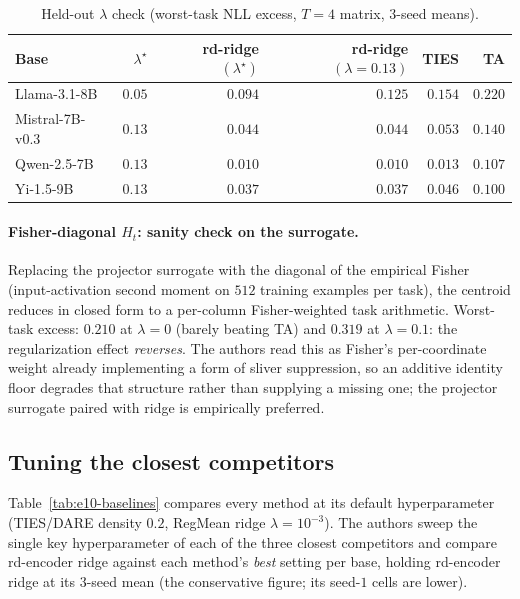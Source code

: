 \begin{table}[h]
\centering
\caption{Held-out $\lambda$ check (worst-task NLL excess, $T = 4$
matrix, $3$-seed means).}
\label{tab:rd-ridge-heldout}
\begin{tabular}{lrrrrr}
\hline
Base & $\lambda^\star$ & rd-ridge $(\lambda^\star)$ & rd-ridge $(\lambda{=}0.13)$ & TIES & TA \\
\hline
Llama-3.1-8B    & $0.05$ & $\mathbf{0.094}$ & $0.125$ & $0.154$ & $0.220$ \\
Mistral-7B-v0.3 & $0.13$ & $\mathbf{0.044}$ & $0.044$ & $0.053$ & $0.140$ \\
Qwen-2.5-7B     & $0.13$ & $\mathbf{0.010}$ & $0.010$ & $0.013$ & $0.107$ \\
Yi-1.5-9B       & $0.13$ & $\mathbf{0.037}$ & $0.037$ & $0.046$ & $0.100$ \\
\hline
\end{tabular}
\end{table}

\paragraph{Fisher-diagonal $H_t$: sanity check on the surrogate.}
Replacing the projector surrogate with the diagonal of the empirical
Fisher (input-activation second moment on $512$ training examples per
task), the centroid reduces in closed form to a per-column
Fisher-weighted task arithmetic. Worst-task excess: $0.210$ at
$\lambda = 0$ (barely beating TA) and $0.319$ at $\lambda = 0.1$:
the regularization effect \emph{reverses}. The authors read this as Fisher's
per-coordinate weight already implementing a form of sliver
suppression, so an additive identity floor degrades that structure
rather than supplying a missing one; the projector surrogate paired
with ridge is empirically preferred.

\subsection{Tuning the closest competitors}
\label{subsec:exp-robustness}

Table~\ref{tab:e10-baselines} compares every method at its default
hyperparameter (TIES/DARE density $0.2$, RegMean ridge
$\lambda = 10^{-3}$). The authors sweep the single key hyperparameter of each
of the three closest competitors and compare rd-encoder ridge against
each method's \emph{best} setting per base, holding rd-encoder ridge
at its $3$-seed mean (the conservative figure; its seed-$1$ cells are
lower).


